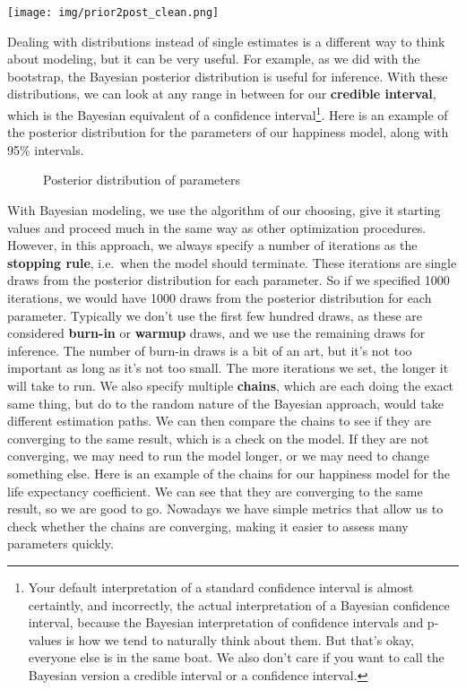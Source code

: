\documentclass[
  letterpaper,
]{krantz}
\begin{document}
\texttt{[image: img/prior2post\_clean.png]}

Dealing with distributions instead of single estimates is a different
way to think about modeling, but it can be very useful. For example, as
we did with the bootstrap, the Bayesian posterior distribution is useful
for inference. With these distributions, we can look at any range in
between for our \textbf{credible interval}, which is the Bayesian
equivalent of a confidence interval\footnote{Your default interpretation
  of a standard confidence interval is almost certaintly, and
  incorrectly, the actual interpretation of a Bayesian confidence
  interval, because the Bayesian interpretation of confidence intervals
  and p-values is how we tend to naturally think about them. But that's
  okay, everyone else is in the same boat. We also don't care if you
  want to call the Bayesian version a credible interval or a confidence
  interval.}. Here is an example of the posterior distribution for the
parameters of our happiness model, along with 95\% intervals.

\begin{figure}[H]


\caption{\label{fig-r-bayesian-posterior}Posterior distribution of
parameters}

\end{figure}%

With Bayesian modeling, we use the algorithm of our choosing, give it
starting values and proceed much in the same way as other optimization
procedures. However, in this approach, we always specify a number of
iterations as the \textbf{stopping rule}, i.e.~when the model should
terminate. These iterations are single draws from the posterior
distribution for each parameter. So if we specified 1000 iterations, we
would have 1000 draws from the posterior distribution for each
parameter. Typically we don't use the first few hundred draws, as these
are considered \textbf{burn-in} or \textbf{warmup} draws, and we use the
remaining draws for inference. The number of burn-in draws is a bit of
an art, but it's not too important as long as it's not too small. The
more iterations we set, the longer it will take to run. We also specify
multiple \textbf{chains}, which are each doing the exact same thing, but
do to the random nature of the Bayesian approach, would take different
estimation paths. We can then compare the chains to see if they are
converging to the same result, which is a check on the model. If they
are not converging, we may need to run the model longer, or we may need
to change something else. Here is an example of the chains for our
happiness model for the life expectancy coefficient. We can see that
they are converging to the same result, so we are good to go. Nowadays
we have simple metrics that allow us to check whether the chains are
converging, making it easier to assess many parameters quickly.
\end{document}
